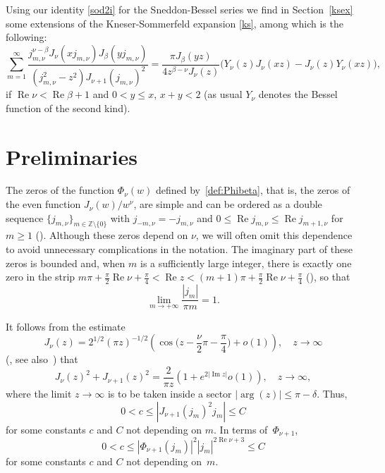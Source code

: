 \documentclass[10pt,leqno,a4paper]{article}
\theoremstyle{plain}
\newcommand{\ZZ}{\mathbb{Z}}
\renewcommand{\Im}{\operatorname{Im}}
\renewcommand{\Re}{\operatorname{Re}}
\numberwithin{equation}{section}
\begin{document}
Using our identity \eqref{sod2i} for the Sneddon-Bessel series we find in Section~\ref{ksex} some extensions of the Kneser-Sommerfeld expansion \eqref{ks}, among which is the following:
\begin{equation}
\label{ksee}
   \sum_{m=1}^\infty
   \frac{j_{m,\nu}^{\nu-\beta}J_\nu(x j_{m,\nu})J_\beta(y j_{m,\nu})}
   {(j_{m,\nu}^{2}-z^2) J_{\nu+1}(j_{m,\nu})^2}
   = \frac{\pi J_\beta(yz)}{4 z^{\beta-\nu}J_\nu(z)}
   \big(Y_\nu(z)J_\nu(xz)-J_\nu(z)Y_\nu(xz)\big),
\end{equation}
if $\Re\nu < \Re\beta + 1$ and $0 < y \leq x$, $x+y<2$ (as usual $Y_\nu$ denotes the Bessel function of the second kind).

\section{Preliminaries}
\label{ss1}

The zeros of the function $\Phi_\nu(w)$ defined by~\eqref{def:Phibeta}, that is, the zeros of the even function $J_{\nu}(w)/w^{\nu}$, are simple and can be ordered as a double sequence $\{j_{m,\nu}\}_{m\in \ZZ \setminus\{0\}}$ with $j_{-m,\nu} = -j_{m,\nu}$ and $0 \leq \Re j_{m,\nu} \leq \Re j_{m+1,\nu}$ for $m \geq 1$ (\cite[\S\,15.41, p.~497]{Wat}). Although these zeros depend on $\nu$, we will often omit this dependence to avoid unnecessary complications in the notation. The imaginary part of these zeros is bounded and, when $m$ is a sufficiently large integer, there is exactly one zero in the strip $m\pi + \frac{\pi}{2} \Re \nu + \frac{\pi}{4} < \Re z < (m+1)\pi + \frac{\pi}{2} \Re \nu + \frac{\pi}{4}$ (\cite[\S\,15.4, p.~497]{Wat}), so that
\[
   \lim_{m\to+\infty} \frac{|j_m|}{\pi m} = 1.
\]

It follows from the estimate
\[
   J_\nu(z)
   = 2^{1/2} (\pi z)^{-1/2}\left(
   \cos\Big(z - \frac{\nu}{2}\pi - \frac{\pi}{4}\Big) + o(1)
   \right),
   \quad z \to \infty
\]
(\cite[\href{https://dlmf.nist.gov/10.7.E8}{(10.7.8)}]{DLMF}, see also~\cite[\S\,7.21(1), p.~199]{Wat}) that
\[
   J_\nu(z)^2 + J_{\nu+1}(z)^2
   = \frac{2}{\pi z} \left(1 + e^{2 |\Im z|} o(1) \right),
   \quad z \to \infty,
\]
where the limit $z \to \infty$ is to be taken inside a sector $|\arg(z)| \leq \pi - \delta$. Thus,
\begin{equation}
\label{Jb+1(jm)}
   0 < c \leq |J_{\nu+1}(j_m)^2 j_m| \leq C
\end{equation}
for some constants $c$ and $C$ not depending on $m$. In terms of~$\Phi_{\nu+1}$,
\[
   0 < c \leq |\Phi_{\nu+1}(j_m)|^2 |j_m|^{2\Re\nu + 3} \leq C
\]
for some constants $c$ and $C$ not depending on~$m$.
\end{document}
